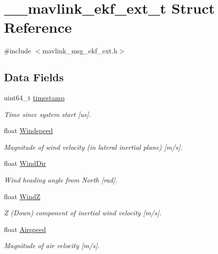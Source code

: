 \hypertarget{struct____mavlink__ekf__ext__t}{\section{\+\_\+\+\_\+mavlink\+\_\+ekf\+\_\+ext\+\_\+t Struct Reference}
\label{struct____mavlink__ekf__ext__t}
}


{\ttfamily \#include $<$mavlink\+\_\+msg\+\_\+ekf\+\_\+ext.\+h$>$}

\subsection*{Data Fields}
\begin{DoxyCompactItemize}
\item 
uint64\+\_\+t \hyperlink{struct____mavlink__ekf__ext__t_ac4bda684e5f48ce4a55fea862458d42c}{timestamp}
\begin{DoxyCompactList}\small\item\em Time since system start \mbox{[}us\mbox{]}. \end{DoxyCompactList}\item 
float \hyperlink{struct____mavlink__ekf__ext__t_a698a2df2f98b82adcb22f8796c7f1d86}{Windspeed}
\begin{DoxyCompactList}\small\item\em Magnitude of wind velocity (in lateral inertial plane) \mbox{[}m/s\mbox{]}. \end{DoxyCompactList}\item 
float \hyperlink{struct____mavlink__ekf__ext__t_a9a26ed5ad677ce0a1925377aeb72531d}{Wind\+Dir}
\begin{DoxyCompactList}\small\item\em Wind heading angle from North \mbox{[}rad\mbox{]}. \end{DoxyCompactList}\item 
float \hyperlink{struct____mavlink__ekf__ext__t_ae44d394d314976288efa59cf2a5622bd}{Wind\+Z}
\begin{DoxyCompactList}\small\item\em Z (Down) component of inertial wind velocity \mbox{[}m/s\mbox{]}. \end{DoxyCompactList}\item 
float \hyperlink{struct____mavlink__ekf__ext__t_aba4f0a01a42dde62ef9ee8dcf5a36249}{Airspeed}
\begin{DoxyCompactList}\small\item\em Magnitude of air velocity \mbox{[}m/s\mbox{]}. \end{DoxyCompactList}\item 

\end{DoxyCompactItemize}
